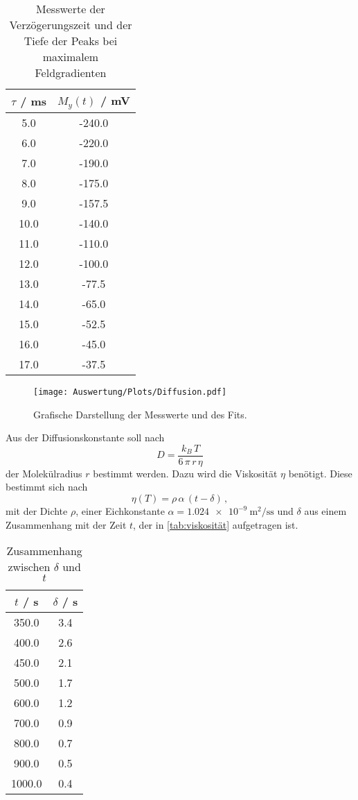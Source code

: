 \begin{table}
  \centering
  \caption{Messwerte der Verzögerungszeit und der Tiefe der Peaks bei maximalem
  Feldgradienten}
  \label{tab:D}
  \begin{tabular}{c c}
    \toprule
    $\tau$ / \si{\ms} & $M_y(t)$ / \si{\mV} \\
    \midrule
    5.0 & -240.0 \\
    6.0 & -220.0 \\
    7.0 & -190.0 \\
    8.0 & -175.0 \\
    9.0 & -157.5 \\
    10.0 & -140.0 \\
    11.0 & -110.0 \\
    12.0 & -100.0 \\
    13.0 & -77.5 \\
    14.0 & -65.0 \\
    15.0 & -52.5 \\
    16.0 & -45.0 \\
    17.0 & -37.5 \\
    \bottomrule
  \end{tabular}
\end{table}

\begin{figure}
  \centering
  \texttt{[image: Auswertung/Plots/Diffusion.pdf]}
  \caption{Grafische Darstellung der Messwerte und des Fits.}
  \label{fig:D}
\end{figure}

Aus der Diffusionskonstante soll nach
\begin{equation}
  D = \frac{k_B \, T}{6 \, \pi \, r \, \eta}
  \label{eqn:Molekülradius}
\end{equation}
der Molekülradius $r$ bestimmt werden. Dazu wird die Viskosität $\eta$ benötigt.
Diese bestimmt sich nach
\begin{equation}
  \eta(T) = \rho \, \alpha \, (t - \delta) \, ,
\end{equation}
mit der Dichte $\rho$, einer Eichkonstante $\alpha =
\SI{1.024e-9}{\meter\squared\per\second\second}$ und $\delta$ aus einem
Zusammenhang mit der Zeit $t$, der in \autoref{tab:viskosität} aufgetragen ist.

\begin{table}
  \centering
  \caption{Zusammenhang zwischen $\delta$ und $t$}
  \label{tab:viskosität}
  \begin{tabular}{c c}
    \toprule
    $t$ / \si{\s} & $\delta$ / \si{\s} \\
    \midrule
    350.0 & 3.4 \\
    400.0 & 2.6 \\
    450.0 & 2.1 \\
    500.0 & 1.7 \\
    600.0 & 1.2 \\
    700.0 & 0.9 \\
    800.0 & 0.7 \\
    900.0 & 0.5 \\
    1000.0 & 0.4 \\
    \bottomrule
  \end{tabular}
\end{table}


